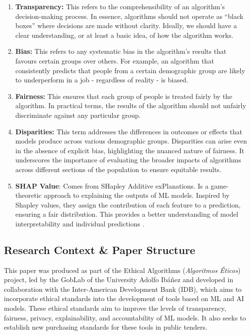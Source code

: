 \documentclass[fleqn,10pt]{wlscirep}
\begin{document}
\begin{enumerate}
    \item \textbf{Transparency:} This refers to the comprehensibility of an algorithm's decision-making process. In essence, algorithms should not operate as ``black boxes'' where decisions are made without clarity. Ideally, we should have a clear understanding, or at least a basic idea, of how the algorithm works.
    
    \item \textbf{Bias:} This refers to any systematic bias in the algorithm's results that favours certain groups over others. For example, an algorithm that consistently predicts that people from a certain demographic group are likely to underperform in a job - regardless of reality - is biased.
    
    \item \textbf{Fairness:} This ensures that each group of people is treated fairly by the algorithm. In practical terms, the results of the algorithm should not unfairly discriminate against any particular group.

    \item \textbf{Disparities:} This term addresses the differences in outcomes or effects that models produce across various demographic groups. Disparities can arise even in the absence of explicit bias, highlighting the nuanced nature of fairness. It underscores the importance of evaluating the broader impacts of algorithms across different sections of the population to ensure equitable results.

    \item \textbf{SHAP Value}: Comes from SHapley Additive exPlanations. Is a game-theoretic approach to explaining the outputs of ML models. Inspired by Shapley values, they assign the contribution of each feature to a prediction, ensuring a fair distribution. This provides a better understanding of model interpretability and individual predictions \cite{rozemberczki2022shapley}.
\end{enumerate}

\subsection{Research Context \& Paper Structure}

This paper was produced as part of the Ethical Algorithms (\textit{Algoritmos Éticos}) project, led by the GobLab of the University Adolfo Ibáñez and developed in collaboration with the Inter-American Development Bank (IDB), which aims to incorporate ethical standards into the development of tools based on ML and AI models. These ethical standards aim to improve the levels of transparency, fairness, privacy, explainability, and accountability of ML models. It also seeks to establish new purchasing standards for these tools in public tenders.
\end{document}

